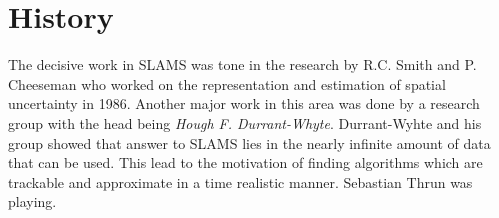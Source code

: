 \section{History}
The decisive work in SLAMS was tone in the research by R.C. Smith and P. Cheeseman who worked on the representation and estimation of spatial uncertainty in 1986. Another major work in this area was done by a research group with the head being \textit{Hough F. Durrant-Whyte}. Durrant-Wyhte and his group showed that answer to SLAMS lies in the nearly infinite amount of data that can be used. This lead to the motivation of finding algorithms which are trackable and approximate in a time realistic manner.\newline
Sebastian Thrun was playing.

